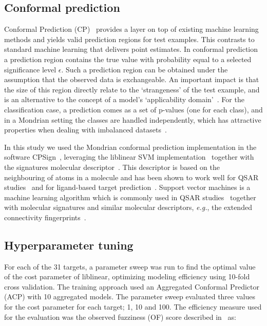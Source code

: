 \documentclass[utf8]{frontiersSCNS} %
\begin{document}
\subsection*{Conformal prediction}
Conformal Prediction (CP)~\cite{Vovk2005} provides a layer on top of
existing machine learning methods and yields valid prediction regions for test
examples. This contrasts to standard machine learning that delivers point
estimates. In conformal prediction a prediction region contains the true
value with probability equal to a selected significance level $\epsilon$. Such
a prediction region can be obtained under the assumption that the observed data
is exchangeable. An important impact is that the size of this region directly
relate to the `strangeness' of the test example, and is an alternative to the
concept of a model's `applicability domain'~\cite{norinder2014introducing}. For
the classification case, a prediction comes as a set of p-values (one for each
class), and in a Mondrian setting the classes are handled independently,
which has attractive properties when dealing with imbalanced
datasets~\cite{Norinder:2017qc,Sun:2017qm}.

In this study we used the Mondrian conformal prediction implementation in the
software CPSign~\cite{CPSignDocs}, leveraging the
liblinear SVM implementation~\cite{fan2008liblinear} together with the
signatures molecular descriptor~\cite{faulon2003signature}.  This descriptor is
based on the neighbouring of atoms in a molecule and has been shown to work
well for QSAR studies~\cite{lapins2018confidence,Alvarsson:2016pw} and for
ligand-based target prediction~\cite{alvarsson2014ligand}. Support vector
machines is a machine learning algorithm which is commonly used in QSAR
studies~\cite{norinder2003support,zhou2011qsar} together with molecular
signatures and similar molecular descriptors, \textit{e.g.}, the extended
connectivity fingerprints~\cite{rogers2010extended}.


\subsection*{Hyperparameter tuning}
For each of the 31 targets, a parameter sweep was run to find the optimal value
of the cost parameter of liblinear, optimizing modeling efficiency using
10-fold cross validation. The training approach used an Aggregated Conformal
Predictor (ACP) with 10 aggregated models.  The parameter sweep evaluated three
values for the cost parameter for each target; 1, 10 and 100. The efficiency
measure used for the evaluation was the observed fuzziness (OF) score described
in~\cite{Vovk2016} as:
\end{document}

